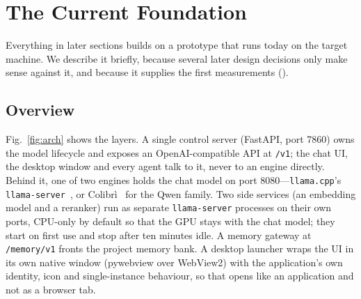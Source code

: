 \section{The Current Foundation}
\label{sec:foundation}

Everything in later sections builds on a prototype that runs today on the target machine. We describe it briefly, because several later design decisions only make sense against it, and because it supplies the first measurements ().

\subsection{Overview}

Fig.~\ref{fig:arch} shows the layers. A single control server (FastAPI, port 7860) owns the model lifecycle and exposes an OpenAI-compatible API at \texttt{/v1}; the chat UI, the desktop window and every agent talk to it, never to an engine directly. Behind it, one of two engines holds the chat model on port 8080---\texttt{llama.cpp}'s \texttt{llama-server}~\cite{llamacpp}, or Colibr\`i~\cite{colibri} for the Qwen family. Two side services (an embedding model and a reranker) run as separate \texttt{llama-server} processes on their own ports, CPU-only by default so that the GPU stays with the chat model; they start on first use and stop after ten minutes idle. A memory gateway at \texttt{/memory/v1} fronts the project memory bank. A desktop launcher wraps the UI in its own native window (pywebview over WebView2) with the application's own identity, icon and single-instance behaviour, so that \hivi{} opens like an application and not as a browser tab.

